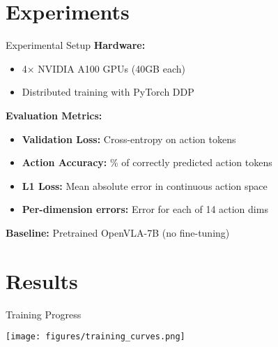 \documentclass[aspectratio=169]{beamer}
\begin{document}
\section{Experiments}

\begin{frame}{Experimental Setup}
\textbf{Hardware:}
\begin{itemize}
    \item 4× NVIDIA A100 GPUs (40GB each)
    \item Distributed training with PyTorch DDP
\end{itemize}

\vspace{0.3cm}
\textbf{Evaluation Metrics:}
\begin{itemize}
    \item \textbf{Validation Loss:} Cross-entropy on action tokens
    \item \textbf{Action Accuracy:} \% of correctly predicted action tokens
    \item \textbf{L1 Loss:} Mean absolute error in continuous action space
    \item \textbf{Per-dimension errors:} Error for each of 14 action dims
\end{itemize}

\vspace{0.3cm}
\textbf{Baseline:} Pretrained OpenVLA-7B (no fine-tuning)
\end{frame}

\section{Results}

\begin{frame}{Training Progress}
\begin{center}
\texttt{[image: figures/training\_curves.png]}
\end{center}
\end{frame}
\end{document}
